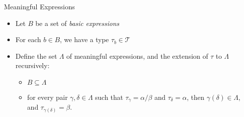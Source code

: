 \documentclass{beamer}
\newlength{\wideitemsep}
\let\olditem\item
\renewcommand{\item}{\setlength{\itemsep}{\wideitemsep}\olditem}
\begin{document}
\begin{frame}{Meaningful Expressions}
\begin{itemize}
\item Let $B$ be a set of \emph{basic expressions}
\item For each $b\in B$, we have a type $\tau_b\in \mathcal{T}$
\item Define the set $\Lambda$ of meaningful expressions, and the extension of $\tau$ to $\Lambda$ recursively:
\begin{itemize}
\item $B\subseteq \Lambda$
\item for every pair $\gamma,\delta\in \Lambda$ such that $\tau_\gamma
  = \alpha/\beta$ and $\tau_\delta = \alpha$, then $\gamma(\delta)\in
  \Lambda$, and $\tau_{\gamma(\delta)} = \beta$.
\end{itemize}
\end{itemize}
\end{frame}



\end{document}
